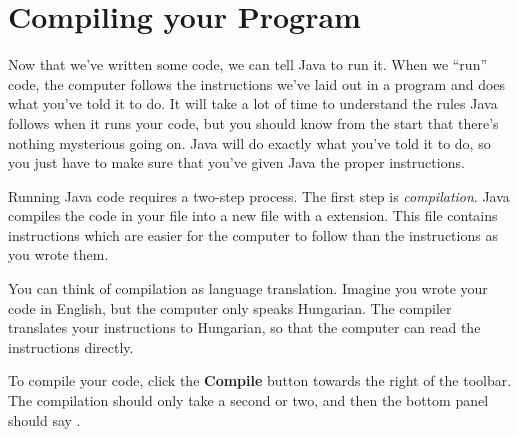 \section{Compiling your Program}

Now that we've written some code, we can tell Java to run it. When we ``run'' code, the computer follows the instructions we've laid out in a program and does what you've told it to do. It will take a lot of time to understand the rules Java follows when it runs your code, but you should know from the start that there's nothing mysterious going on. Java will do exactly what you've told it to do, so you just have to make sure that you've given Java the proper instructions.

Running Java code requires a two-step process. The first step is \emph{compilation}. Java compiles the code in your  file into a new file with a  extension. This file contains instructions which are easier for the computer to follow than the instructions as you wrote them. 

You can think of compilation as language translation. Imagine you wrote your code in English, but the computer only speaks Hungarian. The compiler translates your instructions to Hungarian, so that the computer can read the instructions directly.

To compile your code, click the \textbf{Compile} button towards the right of the toolbar. The compilation should only take a second or two, and then the bottom panel should say .

